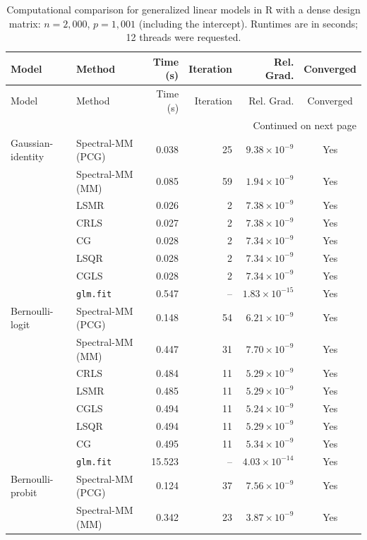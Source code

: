 \begingroup
\small
\setlength{\tabcolsep}{5pt}
\begin{longtable}{llrrrc}
\caption{Computational comparison for generalized linear models in R with a dense design matrix: $n=2{,}000$, $p=1{,}001$ (including the intercept). Runtimes are in seconds; 12 threads were requested.}
\label{tab:R-dense-glm-strict}\\
\toprule
Model & Method & Time (s) & Iteration & Rel. Grad. & Converged \\
\midrule
\endfirsthead
\toprule
Model & Method & Time (s) & Iteration & Rel. Grad. & Converged \\
\midrule
\endhead
\midrule
\multicolumn{6}{r}{Continued on next page}\\
\endfoot
\bottomrule
\endlastfoot
Gaussian-identity & Spectral-MM (PCG) & 0.038 & 25 & $9.38\times10^{-9}$ & Yes \\
 & Spectral-MM (MM) & 0.085 & 59 & $1.94\times10^{-9}$ & Yes \\
 & LSMR & 0.026 & 2 & $7.38\times10^{-9}$ & Yes \\
 & CRLS & 0.027 & 2 & $7.38\times10^{-9}$ & Yes \\
 & CG & 0.028 & 2 & $7.34\times10^{-9}$ & Yes \\
 & LSQR & 0.028 & 2 & $7.34\times10^{-9}$ & Yes \\
 & CGLS & 0.028 & 2 & $7.34\times10^{-9}$ & Yes \\
 & \texttt{glm.fit} & 0.547 & -- & $1.83\times10^{-15}$ & Yes \\
\midrule
Bernoulli-logit & Spectral-MM (PCG) & 0.148 & 54 & $6.21\times10^{-9}$ & Yes \\
 & Spectral-MM (MM) & 0.447 & 31 & $7.70\times10^{-9}$ & Yes \\
 & CRLS & 0.484 & 11 & $5.29\times10^{-9}$ & Yes \\
 & LSMR & 0.485 & 11 & $5.29\times10^{-9}$ & Yes \\
 & CGLS & 0.494 & 11 & $5.24\times10^{-9}$ & Yes \\
 & LSQR & 0.494 & 11 & $5.29\times10^{-9}$ & Yes \\
 & CG & 0.495 & 11 & $5.34\times10^{-9}$ & Yes \\
 & \texttt{glm.fit} & 15.523 & -- & $4.03\times10^{-14}$ & Yes \\
\midrule
Bernoulli-probit & Spectral-MM (PCG) & 0.124 & 37 & $7.56\times10^{-9}$ & Yes \\
 & Spectral-MM (MM) & 0.342 & 23 & $3.87\times10^{-9}$ & Yes \\

\end{longtable}
